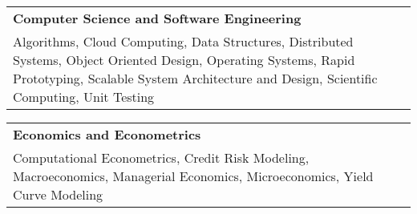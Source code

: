 \documentclass[10pt]{article}
\newcommand{\tabularxwidth}{\textwidth}
\begin{document}
        
            \vspace{.5em}
        

    
        \begin{tabularx}{\tabularxwidth}{X}
            \textbf{Computer Science and Software Engineering} \\
            
    
            Algorithms, 
            Cloud Computing, 
            Data Structures, 
            Distributed Systems, 
            Object Oriented Design, 
            Operating Systems, 
            Rapid Prototyping, 
            Scalable System Architecture and Design, 
            Scientific Computing, 
            Unit Testing \\
        \end{tabularx}

        
            \vspace{.5em}
        

    
        \begin{tabularx}{\tabularxwidth}{X}
            \textbf{Economics and Econometrics} \\
            
    
            Computational Econometrics, 
            Credit Risk Modeling, 
            Macroeconomics, 
            Managerial Economics, 
            Microeconomics, 
            Yield Curve Modeling \\
        \end{tabularx}

        
            \vspace{.5em}
        
\end{document}
